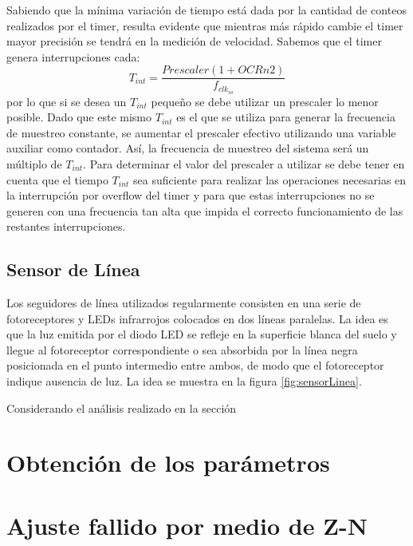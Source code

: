 \documentclass[10pt,conference,a4paper,onecolumn]{article}%
\begin{document}
Sabiendo que la mínima variación de tiempo está dada por la cantidad de conteos realizados por el timer, resulta evidente que mientras más rápido cambie el timer mayor precisión se tendrá en la medición de velocidad. Sabemos que el timer genera interrupciones cada:
\begin{equation}
T_{int}=\frac{Prescaler(1+OCRn2)}{f_{clk_{io}}}
\end{equation}
por lo que si se desea un $T_{int}$ pequeño se debe utilizar un prescaler lo menor posible. Dado que este mismo $T_{int}$ es el que se utiliza para generar la frecuencia de muestreo constante, se aumentar el prescaler efectivo utilizando una variable auxiliar como contador. Así, la frecuencia de muestreo del sistema será un múltiplo de $T_{int}$. Para determinar el valor del prescaler a utilizar se debe tener en cuenta que el tiempo $T_{int}$ sea suficiente para realizar las operaciones necesarias en la interrupción por overflow del timer y para que estas interrupciones no se generen con una frecuencia tan alta que impida el correcto funcionamiento de las restantes interrupciones.

\subsection{Sensor de Línea}
Los seguidores de línea utilizados regularmente consisten en una serie de fotoreceptores y LEDs infrarrojos colocados en dos líneas paralelas. La idea es que la luz emitida por el diodo LED se refleje en la superficie blanca del suelo y llegue al fotoreceptor correspondiente o sea absorbida por la línea negra posicionada en el punto intermedio entre ambos, de modo que el fotoreceptor indique ausencia de luz. La idea se muestra en la figura \ref{fig:sensorLinea}.

Considerando el análisis realizado en la sección 

\section{Obtención de los parámetros}

\section{Ajuste fallido por medio de Z-N}
\end{document}
